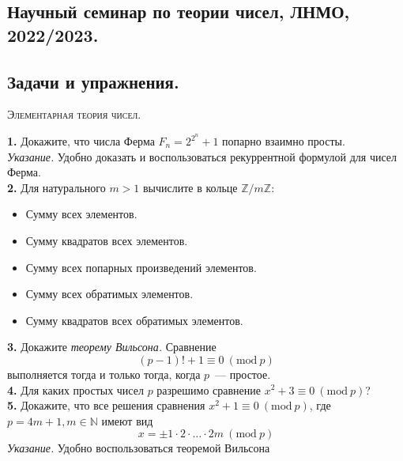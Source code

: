 \documentclass[a4, 12pt]{article}
\renewcommand{\bf}{\textbf}
\newcommand{\Mod}[1]{\ (\mathrm{mod}\ #1)}
\begin{document}
\begin{center}
\section*{Научный семинар по теории чисел, ЛНМО, 2022/2023.}
\subsection*{Задачи и упражнения.}
\end{center}
\begin{center}
    \textsc{Элементарная теория чисел.}
\end{center}

\bf{1.} Докажите, что числа Ферма $F_n = 2^{2^n} + 1$ попарно взаимно просты. \\
\emph{Указание.} Удобно доказать и воспользоваться рекуррентной формулой для чисел Ферма. \\

\bf{2.} Для натурального $m > 1$ вычислите в кольце $\mathbb{Z}/m\mathbb{Z}$:
\begin{itemize}
    \item Сумму всех элементов.
    \item Сумму квадратов всех элементов.
    \item Сумму всех попарных произведений  элементов.
    \item Сумму всех обратимых элементов.
    \item Сумму квадратов всех обратимых элементов.
\end{itemize}

\bf{3.} Докажите \emph{теорему Вильсона.} Сравнение
\[ (p - 1)! + 1 \equiv 0 \Mod{p} \]
выполняется тогда и только тогда, когда $p$~---  простое. \\

\bf{4.} Для каких простых чисел $p$ разрешимо сравнение $x^2 + 3 \equiv 0 \Mod{p}$?\\

\bf{5.} Докажите, что все решения сравнения $x^2 + 1 \equiv 0 \Mod{p}$, где $p = 4m + 1, m \in \mathbb{N}$ имеют вид
\[ x = \pm 1 \cdot 2 \cdot \ldots \cdot 2m \Mod{p} \]
\emph{Указание.} Удобно воспользоваться теоремой Вильсона
\end{document}
